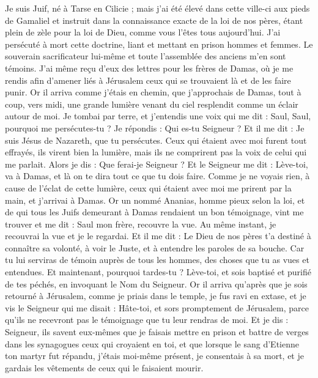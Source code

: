 \begin{multicols}{2}
{{{Je suis Juif, né à Tarse en Cilicie ; mais j'ai été élevé dans cette ville-ci aux pieds de Gamaliel et instruit dans la connaissance exacte de la loi de nos pères, étant plein de zèle pour la loi de Dieu, comme vous l'êtes tous aujourd'hui.
J'ai persécuté à mort cette doctrine, liant et mettant en prison hommes et femmes.
Le souverain sacrificateur lui-même et toute l'assemblée des anciens m'en sont témoins. J'ai même reçu d'eux des lettres pour les frères de Damas, où je me rendis afin d'amener liés à Jérusalem ceux qui se trouvaient là et de les faire punir.
Or il arriva comme j'étais en chemin, que j'approchais de Damas, tout à coup, vers midi, une grande lumière venant du ciel resplendit comme un éclair autour de moi.
Je tombai par terre, et j'entendis une voix qui me dit : Saul, Saul, pourquoi me persécutes-tu ?
Je répondis : Qui es-tu Seigneur ? Et il me dit : Je suis Jésus de Nazareth, que tu persécutes.
Ceux qui étaient avec moi furent tout effrayés, ils virent bien la lumière, mais ils ne comprirent pas la voix de celui qui me parlait. Alors je dis : Que ferai-je Seigneur ?
Et le Seigneur me dit : Lève-toi, va à Damas, et là on te dira tout ce que tu dois faire.
Comme je ne voyais rien, à cause de l'éclat de cette lumière, ceux qui étaient avec moi me prirent par la main, et j'arrivai à Damas.
Or un nommé Ananias, homme pieux selon la loi, et de qui tous les Juifs demeurant à Damas rendaient un bon témoignage, vint me trouver
et me dit : Saul mon frère, recouvre la vue. Au même instant, je recouvrai la vue et je le regardai.
Et il me dit : Le Dieu de nos pères t'a destiné à connaître sa volonté, à voir le Juste, et à entendre les paroles de sa bouche.
Car tu lui serviras de témoin auprès de tous les hommes, des choses que tu as vues et entendues.
Et maintenant, pourquoi tardes-tu ? Lève-toi, et sois baptisé et purifié de tes péchés, en invoquant le Nom du Seigneur.
Or il arriva qu'après que je sois retourné à Jérusalem, comme je priais dans le temple, je fus ravi en extase,
et je vis le Seigneur qui me disait : Hâte-toi, et sors promptement de Jérusalem, parce qu'ils ne recevront pas le témoignage que tu leur rendras de moi.
Et je dis : Seigneur, ils savent eux-mêmes que je faisais mettre en prison et battre de verges dans les synagogues ceux qui croyaient en toi,
et que lorsque le sang d'Etienne ton martyr fut répandu, j'étais moi-même présent, je consentais à sa mort, et je gardais les vêtements de ceux qui le faisaient mourir.
}}}
\end{multicols}
